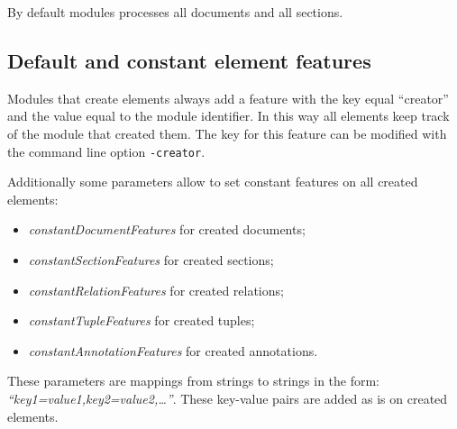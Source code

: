 \documentclass[a4paper]{book}
\begin{document}
By default modules processes all documents and all sections.

\subsection{Default and constant element features}
Modules that create elements always add a feature with the key equal ``creator'' and the value equal to the module identifier.
In this way all elements keep track of the module that created them.
The key for this feature can be modified with the command line option \texttt{-creator}.

Additionally some parameters allow to set constant features on all created elements:
\begin{itemize}
\item \emph{constantDocumentFeatures} for created documents;
\item \emph{constantSectionFeatures} for created sections;
\item \emph{constantRelationFeatures} for created relations;
\item \emph{constantTupleFeatures} for created tuples;
\item \emph{constantAnnotationFeatures} for created annotations.
\end{itemize}

These parameters are mappings from strings to strings in the form: \emph{``key1=value1,key2=value2,\ldots''}.
These key-value pairs are added as is on created elements.




% 
\end{document}
